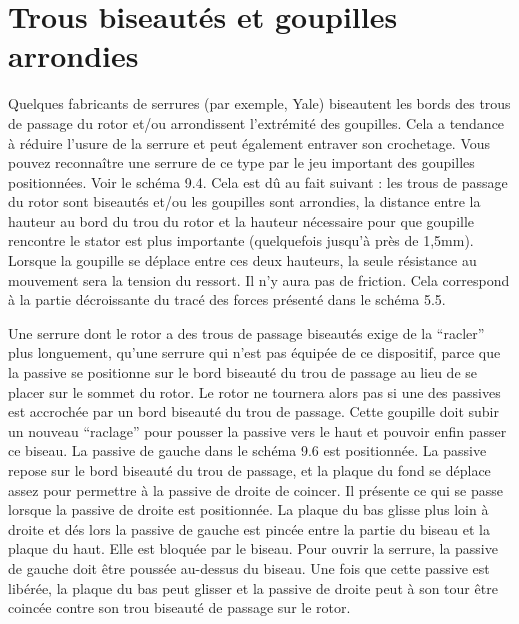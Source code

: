 \documentclass[a4paper,french,11pt,twoside]{report}
\begin{document}
\section{Trous biseautés et goupilles arrondies}

Quelques fabricants de serrures (par exemple, Yale) biseautent les bords des trous de passage du rotor et/ou arrondissent l'extrémité des goupilles. Cela a tendance à réduire l'usure de la serrure et peut également entraver son crochetage. Vous pouvez reconnaître une serrure de ce type par le jeu important des goupilles positionnées. Voir le schéma 9.4. Cela est dû au fait suivant : les trous de passage du rotor sont biseautés et/ou les goupilles sont arrondies, la distance entre la hauteur au bord du trou du rotor et la hauteur nécessaire pour que goupille rencontre le stator est plus importante (quelquefois jusqu'à près de 1,5mm). Lorsque la goupille se déplace entre ces deux hauteurs, la seule résistance au mouvement sera la tension du ressort. Il n'y aura pas de friction. Cela correspond à la partie décroissante du tracé des forces présenté dans le schéma 5.5.

Une serrure dont le rotor a des trous de passage biseautés exige de la \enquote{racler} plus longuement, qu'une serrure qui n'est pas équipée de ce dispositif, parce que la passive se positionne sur le bord biseauté du trou de passage au lieu de se placer sur le sommet du rotor. Le rotor ne tournera alors pas si une des passives est accrochée par un bord biseauté du trou de passage. Cette goupille doit subir un nouveau \enquote{raclage} pour pousser la passive vers le haut et pouvoir enfin passer ce biseau. La passive de gauche dans le schéma 9.6 est positionnée. La passive repose sur le bord biseauté du trou de passage, et la plaque du fond se déplace assez pour permettre à la passive de droite de coincer. Il présente ce qui se passe lorsque la passive de droite est positionnée. La plaque du bas glisse plus loin à droite et dés lors la passive de gauche est pincée entre la partie du biseau et la plaque du haut. Elle est bloquée par le biseau. Pour ouvrir la serrure, la passive de gauche doit être poussée au-dessus du biseau. Une fois que cette passive est libérée, la plaque du bas peut glisser et la passive de droite peut à son tour être coincée contre son trou biseauté de passage sur le rotor.
\end{document}
